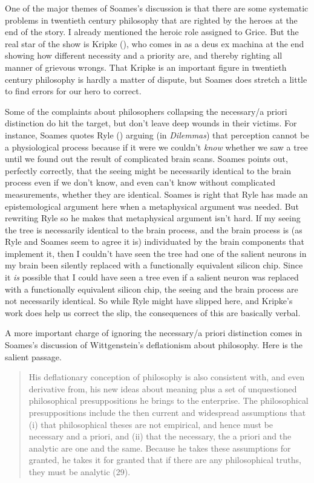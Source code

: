 \documentclass[
  11pt,
  letterpaper,
  DIV=11,
  numbers=noendperiod,
  twoside]{scrartcl}
\begin{document}
One of the major themes of Soames's discussion is that there are some
systematic problems in twentieth century philosophy that are righted by
the heroes at the end of the story. I already mentioned the heroic role
assigned to Grice. But the real star of the show is Kripke
(), who comes in as a deus ex
machina at the end showing how different necessity and a priority are,
and thereby righting all manner of grievous wrongs. That Kripke is an
important figure in twentieth century philosophy is hardly a matter of
dispute, but Soames does stretch a little to find errors for our hero to
correct.

Some of the complaints about philosophers collapsing the necessary/a
priori distinction do hit the target, but don't leave deep wounds in
their victims. For instance, Soames quotes Ryle
() arguing (in \emph{Dilemmas}) that
perception cannot be a physiological process because if it were we
couldn't \emph{know} whether we saw a tree until we found out the result
of complicated brain scans. Soames points out, perfectly correctly, that
the seeing might be necessarily identical to the brain process even if
we don't know, and even can't know without complicated measurements,
whether they are identical. Soames is right that Ryle has made an
epistemological argument here when a metaphysical argument was needed.
But rewriting Ryle so he makes that metaphysical argument isn't hard. If
my seeing the tree is necessarily identical to the brain process, and
the brain process is (as Ryle and Soames seem to agree it is)
individuated by the brain components that implement it, then I couldn't
have seen the tree had one of the salient neurons in my brain been
silently replaced with a functionally equivalent silicon chip. Since it
\emph{is} possible that I could have seen a tree even if a salient
neuron was replaced with a functionally equivalent silicon chip, the
seeing and the brain process are not necessarily identical. So while
Ryle might have slipped here, and Kripke's work does help us correct the
slip, the consequences of this are basically verbal.

A more important charge of ignoring the necessary/a priori distinction
comes in Soames's discussion of Wittgenstein's deflationism about
philosophy. Here is the salient passage.

\begin{quote}
His deflationary conception of philosophy is also consistent with, and
even derivative from, his new ideas about meaning plus a set of
unquestioned philosophical presuppositions he brings to the enterprise.
The philosophical presuppositions include the then current and
widespread assumptions that (i) that philosophical theses are not
empirical, and hence must be necessary and a priori, and (ii) that the
necessary, the a priori and the analytic are one and the same. Because
he takes these assumptions for granted, he takes it for granted that if
there are any philosophical truths, they must be analytic (29).
\end{quote}
\end{document}
